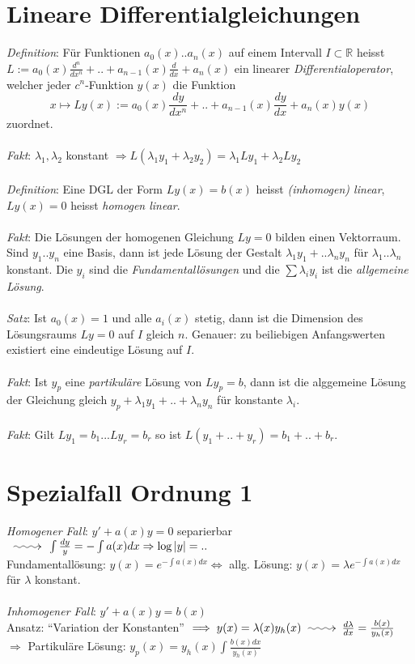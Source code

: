 \documentclass[12pt,a4paper,titlepage]{article}
\makeatletter
\newcommand{\longsquiggly}{\xymatrix{{}\ar@{~>}[r]&{}}}
\makeatother
\begin{document}
\section*{Lineare Differentialgleichungen}
\textit{Definition}: Für Funktionen $a_0(x)..a_n(x)$ auf einem Intervall $I\subset\mathbb{R}$ heisst $L:=a_0(x)\frac{d^n}{dx^n}+..+a_{n-1}(x)\frac{d}{dx}+a_n(x)$ ein linearer \emph{Differentialoperator}, welcher jeder $c^n$-Funktion $y(x)$ die Funktion
$$x\mapsto Ly(x):= a_0(x)\frac{dy}{dx^n}+..+a_{n-1}(x)\frac{dy}{dx}+a_n(x)y(x)$$
zuordnet.\\
\\
\textit{Fakt}: $\lambda_1,\lambda_2$ konstant $\Rightarrow L(\lambda_1y_1+\lambda_2y_2)=\lambda_1Ly_1+\lambda_2Ly_2$ \\
\\
\textit{Definition}: Eine DGL der Form $Ly(x)=b(x)$ heisst \emph{(inhomogen) linear}, $Ly(x)=0$ heisst \emph{homogen linear}. \\
\\
\textit{Fakt}: Die Lösungen der homogenen Gleichung $Ly=0$ bilden einen Vektorraum. Sind $y_1..y_n$ eine Basis, dann ist jede Lösung der Gestalt $\lambda_1y_1+..\lambda_ny_n$ für $\lambda_1..\lambda_n$ konstant. Die $y_i$ sind die \emph{Fundamentallösungen} und die $\sum\lambda_iy_i$ ist die \emph{allgemeine Lösung}. \\
\\
\textit{Satz}: Ist $a_0(x)=1$ und alle $a_i(x)$ stetig, dann ist die Dimension des Lösungsraums $Ly=0$ auf $I$ gleich $n$. Genauer: zu beiliebigen Anfangswerten existiert eine eindeutige Lösung auf $I$. \\
\\
\textit{Fakt}: Ist $y_p$ eine \emph{partikuläre} Lösung von $Ly_p=b$, dann ist die alggemeine Lösung der Gleichung gleich $y_p+\lambda_1y_1+..+\lambda_ny_n$ für konstante $\lambda_i$. \\
\\
\textit{Fakt}: Gilt $Ly_1=b_1...Ly_r=b_r$ so ist $L(y_1+..+y_r)=b_1+..+b_r$.

\section*{Spezialfall Ordnung 1}
\textit{Homogener Fall}: $y'+a(x)y=0$ separierbar $\longsquiggly \int\frac{dy}{y}=-\int a(x)dx \Rightarrow \log|y|= ..$ \\
Fundamentallösung: $y(x)=e^{-\int a(x)dx} \iff$ allg. Lösung: $y(x)=\lambda e^{-\int a(x)dx}$ für $\lambda$ konstant.  \\
\\
\textit{Inhomogener Fall}: $y'+a(x)y=b(x)$\\
Ansatz: ``Variation der Konstanten'' $\implies y(x)=\lambda(x)y_h(x) \longsquiggly \frac{d\lambda}{dx}=\frac{b(x)}{y_h(x)}$ \\
$\Rightarrow $ Partikuläre Lösung: $y_p(x)=y_h(x)\int\frac{b(x)dx}{y_h(x)}$
\end{document}
